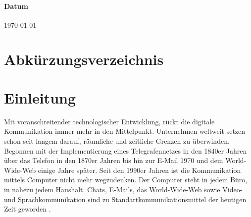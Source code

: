 \documentclass[a4paper,11pt]{article}%
\renewcommand{\\}{\vspace*{0.5\baselineskip} \newline}
\begin{document}
			\paragraph{Datum}
			{\today}
	\newpage
	\tableofcontents
	\newpage
	
\section*{Abkürzungsverzeichnis}
	
	
	\newpage
	
%	
	
	
\section*{Einleitung}
	Mit voranschreitender technologischer Entwicklung, rückt die digitale Kommunikation immer mehr in den Mittelpunkt. Unternehmen weltweit setzen schon seit langem darauf, räumliche und zeitliche Grenzen zu überwinden. Begonnen mit der Implementierung eines Telegrafennetzes in den 1840er Jahren über das Telefon in den 1870er Jahren bis hin zur E-Mail 1970 und dem World-Wide-Web einige Jahre später.
	Seit den 1990er Jahren ist die Kommunikation mittels Computer nicht mehr wegzudenken. Der Computer steht in jedem Büro, in nahezu jedem Haushalt. Chats, E-Mails, das World-Wide-Web sowie Video- und Sprachkommunikation sind zu Standartkommunikationsmittel der heutigen Zeit geworden \citep[p. 14-16]{thurlow2004computer}.
	
\end{document}
